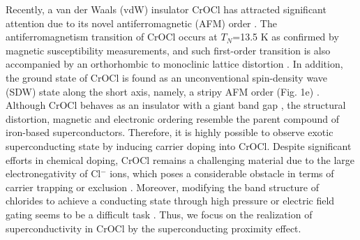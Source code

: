 \documentclass[%
 reprint,
superscriptaddress,
 amsmath,amssymb,
 aps,
]{revtex4-2}
\begin{document}
Recently, a van der Waals (vdW) insulator CrOCl has attracted significant attention due to its novel antiferromagnetic (AFM) order \cite{CrOCl1975, CrOCl2019,CrOCl,CrOCl2022,CrOCl2023}. The antiferromagnetism transition of CrOCl occurs at $T_N$=13.5 K as confirmed by magnetic susceptibility measurements, and such first-order transition is also accompanied by an orthorhombic to monoclinic lattice distortion \cite{CrOCl2009}. In addition, the ground state of CrOCl is found as an unconventional spin-density wave (SDW) state along the short axis, namely, a stripy AFM order (Fig. 1e) \cite{CrOCl}. Although CrOCl behaves as an insulator with a giant band gap \cite{PRM}, the structural distortion, magnetic and electronic ordering resemble the parent compound of iron-based superconductors. Therefore, it is highly possible to observe exotic superconducting state by inducing carrier doping into CrOCl. Despite significant efforts in chemical doping, CrOCl remains a challenging material due to the large electronegativity of Cl$^-$ ions, which poses a considerable obstacle in terms of carrier trapping or exclusion \cite{doping}. Moreover, modifying the band structure of chlorides to achieve a conducting state through high pressure or electric field gating seems to be a difficult task \cite{pressure}. Thus, we focus on the realization of superconductivity in CrOCl by the superconducting proximity effect.

\end{document}
